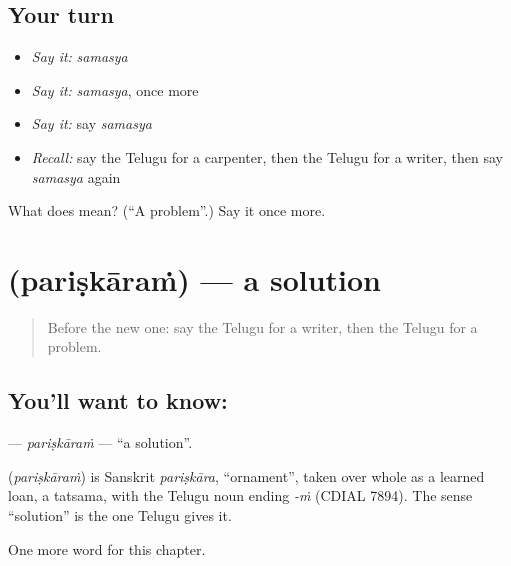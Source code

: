 \subsection*{Your turn}
\begin{itemize}
\raggedright
  \item \emph{Say it:} \emph{samasya}
  \item \emph{Say it:} \emph{samasya}, once more
  \item \emph{Say it:} say \emph{samasya}
  \item \emph{Recall:} say the Telugu for a carpenter, then the Telugu for a writer, then say \emph{samasya} again
\end{itemize}

\begin{tcolorbox}[breakable,colback=teal!4,colframe=teal!35!black,title={Before you move on}]
What does  mean? (\textquotedblleft{}A problem\textquotedblright{}.) Say it once more.
\end{tcolorbox}
\section[\texorpdfstring{\te{పరిష్కారం} (pariṣkāraṁ)}{పరిష్కారం (pariṣkāraṁ)}]{ (pariṣkāraṁ) — a solution}

\label{lesson:TE-C197-pariskaram}



\begin{quote}
Before the new one: say the Telugu for a writer, then the Telugu for a problem.
\end{quote}

\subsection*{You'll want to know: }
\textbf{} — \emph{pariṣkāraṁ} — \textquotedblleft{}a solution\textquotedblright{}.

\begin{cousinweb}
\textbf{} (\emph{pariṣkāraṁ}) is Sanskrit \emph{pariṣkāra}, \textquotedblleft{}ornament\textquotedblright{}, taken over whole as a learned loan, a tatsama, with the Telugu noun ending \emph{-ṁ} (CDIAL 7894). The sense \textquotedblleft{}solution\textquotedblright{} is the one Telugu gives it.
\end{cousinweb}

\begin{grammarlens}[title={What you've built}]
One more word for this chapter.
\end{grammarlens}

